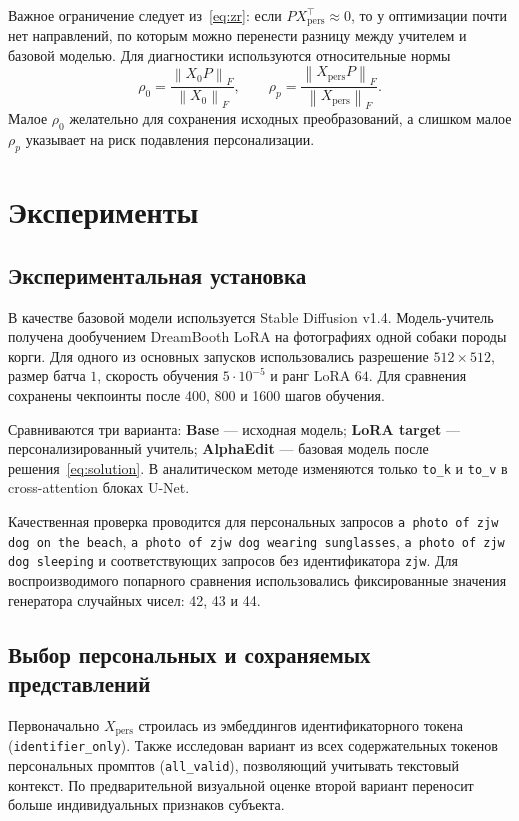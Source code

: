 \documentclass{article}
\newcommand{\Xp}{X_{\mathrm{pers}}}
\newcommand{\Xo}{X_{0}}
\newcommand{\Fnorm}[1]{\left\lVert #1\right\rVert_{F}}
\begin{document}
Важное ограничение следует из~\eqref{eq:zr}:
если $P\Xp^\top\approx0$, то у оптимизации почти нет направлений,
по которым можно перенести разницу между учителем и базовой моделью.
Для диагностики используются относительные нормы
\begin{equation}\label{eq:proj-diagnostics}
    \rho_0=\frac{\Fnorm{\Xo P}}{\Fnorm{\Xo}},\qquad
    \rho_p=\frac{\Fnorm{\Xp P}}{\Fnorm{\Xp}}.
\end{equation}
Малое $\rho_0$ желательно для сохранения исходных преобразований,
а слишком малое $\rho_p$ указывает на риск подавления персонализации.

\section{Эксперименты}\label{sec:exp}

\subsection{Экспериментальная установка}

В качестве базовой модели используется Stable Diffusion v1.4.
Модель-учитель получена дообучением DreamBooth LoRA на фотографиях
одной собаки породы корги. Для одного из основных запусков использовались
разрешение $512\times512$, размер батча $1$, скорость обучения
$5\cdot10^{-5}$ и ранг LoRA $64$. Для сравнения сохранены
чекпоинты после 400, 800 и 1600 шагов обучения.

Сравниваются три варианта: \textbf{Base} --- исходная модель;
\textbf{LoRA target} --- персонализированный учитель;
\textbf{AlphaEdit} --- базовая модель после решения~\eqref{eq:solution}.
В аналитическом методе изменяются только \texttt{to\_k} и \texttt{to\_v}
в cross-attention блоках U-Net.

Качественная проверка проводится для персональных запросов
\texttt{a photo of zjw dog on the beach},
\texttt{a photo of zjw dog wearing sunglasses},
\texttt{a photo of zjw dog sleeping}
и соответствующих запросов без идентификатора \texttt{zjw}.
Для воспроизводимого попарного сравнения использовались фиксированные
значения генератора случайных чисел: 42, 43 и 44.

\subsection{Выбор персональных и сохраняемых представлений}

Первоначально $\Xp$ строилась из эмбеддингов идентификаторного токена
(\texttt{identifier\_only}). Также исследован вариант из всех содержательных
токенов персональных промптов (\texttt{all\_valid}), позволяющий учитывать
текстовый контекст. По предварительной визуальной оценке второй вариант
переносит больше индивидуальных признаков субъекта.
\end{document}
